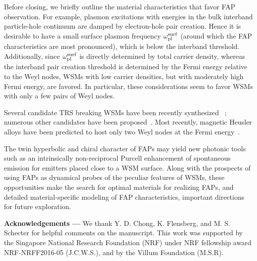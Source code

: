 \documentclass[aps,twocolumn,prl,groupedaddress]{revtex4}
\begin{document}
Before closing, we briefly outline the material characteristics that favor FAP observation. 
For example, plasmon excitations with energies in the bulk interband particle-hole continuum are damped by electron-hole pair creation. 
Hence it is desirable to have a small surface plasmon frequency $\omega_{\rm pl}^{\rm surf}$ (around which the FAP characteristics are most pronounced), which is below the interband threshold. 
Additionally, since $\omega_{\rm pl}^{\rm surf}$ is directly determined by total carrier density, whereas the interband pair creation threshold is determined by the Fermi energy relative to the Weyl nodes, WSMs with low carrier densities, but with moderately high Fermi energy, are favored. 
In particular, these considerations seem to favor WSMs with only a few pairs of Weyl nodes.  

Several candidate TRS breaking WSMs have been recently synthesized
~\cite{sushkov,borisenko}; numerous other candidates 
have been proposed~\cite{wan,yingran,balents,tong,bulmash}. Most recently, magnetic Heusler alloys have been predicted to host only two Weyl nodes at the Fermi energy~\cite{bernevig16}. 

The twin hyperbolic and chiral character of FAPs may yield new photonic tools such as an intrinsically non-reciprocal Purcell enhancement of spontaneous emission 
for emitters placed close to a WSM surface. 
Along with the prospects of using FAPs as dynamical probes of the peculiar features of WSMs, these opportunities make the search for optimal materials for realizing FAPs, and detailed material-specific modeling of FAP characteristics, important directions for future exploration.

\vspace{2mm}
{\bf Acknowledgements ---} We thank Y. D. Chong, K. Flensberg, and M. S. Schecter for helpful comments on the manuscript. This work was supported by the Singapore National Research Foundation (NRF) under NRF fellowship award NRF-NRFF2016-05 (J.C.W.S.), and by the Villum Foundation (M.S.R).
\end{document}
